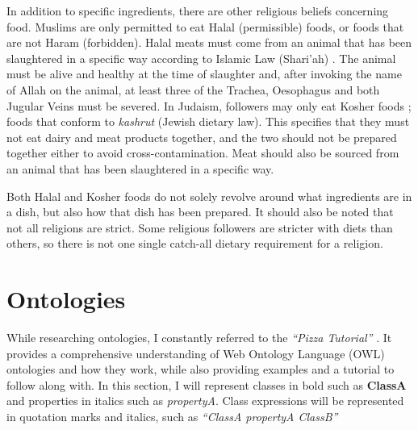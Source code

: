 In addition to specific ingredients, there are other religious beliefs concerning food. Muslims are only permitted to eat Halal (permissible) foods, or foods that are not Haram (forbidden). Halal meats must come from an animal that has been slaughtered in a specific way according to Islamic Law (Shari'ah) \cite{halal_monitoring_committee_2018}. The animal must be alive and healthy at the time of slaughter and, after invoking the name of Allah on the animal, at least three of the Trachea, Oesophagus and both Jugular Veins must be severed. In Judaism, followers may only eat Kosher foods \cite{kosher_2023}; foods that conform to \textit{kashrut} (Jewish dietary law). This specifies that they must not eat dairy and meat products together, and the two should not be prepared together either to avoid cross-contamination. Meat should also be sourced from an animal that has been slaughtered in a specific way.

Both Halal and Kosher foods do not solely revolve around what ingredients are in a dish, but also how that dish has been prepared. It should also be noted that not all religions are strict. Some religious followers are stricter with diets than others, so there is not one single catch-all dietary requirement for a religion.


\section{Ontologies}

While researching ontologies, I constantly referred to the \textit{``Pizza Tutorial''} \cite{pizza_tutorial_site}. It provides a comprehensive understanding of Web Ontology Language (OWL) ontologies and how they work, while also providing examples and a tutorial to follow along with. In this section, I will represent classes in bold such as \textbf{ClassA} and properties in italics such as \textit{propertyA}. Class expressions will be represented in quotation marks and italics, such as \textit{``ClassA propertyA ClassB''}

